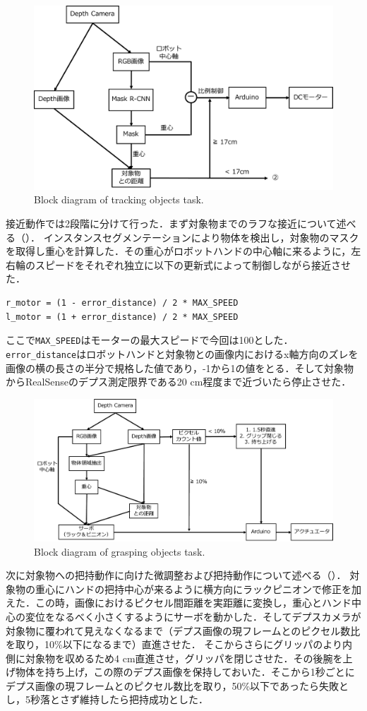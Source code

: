 \begin{figure}
    \centering
    \includegraphics[width=0.7\linewidth]{figure/chapter4/2号機制御図_接近}
    \caption{Block diagram of tracking objects task.}
    \label{fig:2号機接近}
\end{figure}


接近動作では2段階に分けて行った．まず対象物までのラフな接近について述べる（）．
インスタンスセグメンテーションにより物体を検出し，対象物のマスクを取得し重心を計算した．その重心がロボットハンドの中心軸に来るように，左右輪のスピードをそれぞれ独立に以下の更新式によって制御しながら接近させた．
\begin{lstlisting}[caption=接近アルゴリズム, label=code:motor]
r_motor = (1 - error_distance) / 2 * MAX_SPEED
l_motor = (1 + error_distance) / 2 * MAX_SPEED
\end{lstlisting}
ここで\texttt{MAX\_SPEED}はモーターの最大スピードで今回は100とした．\texttt{error\_distance}はロボットハンドと対象物との画像内におけるx軸方向のズレを画像の横の長さの半分で規格した値であり，-1から1の値をとる．そして対象物からRealSenseのデプス測定限界である20 cm程度まで近づいたら停止させた．

\begin{figure}
    \centering
    \includegraphics[width=0.7\linewidth]{figure/chapter4/2号機制御図_把持}
    \caption{Block diagram of grasping objects task.}
    \label{fig:2号機把持}
\end{figure}

次に対象物への把持動作に向けた微調整および把持動作について述べる（）．
対象物の重心にハンドの把持中心が来るように横方向にラックピニオンで修正を加えた．この時，画像におけるピクセル間距離を実距離に変換し，重心とハンド中心の変位をなるべく小さくするようにサーボを動かした．そしてデプスカメラが対象物に覆われて見えなくなるまで（デプス画像の現フレームとのピクセル数比を取り，10\%以下になるまで）直進させた．
そこからさらにグリッパのより内側に対象物を収めるため4 cm直進させ，グリッパを閉じさせた．その後腕を上げ物体を持ち上げ，この際のデプス画像を保持しておいた．そこから1秒ごとにデプス画像の現フレームとのピクセル数比を取り，50\%以下であったら失敗とし，5秒落とさず維持したら把持成功とした．

